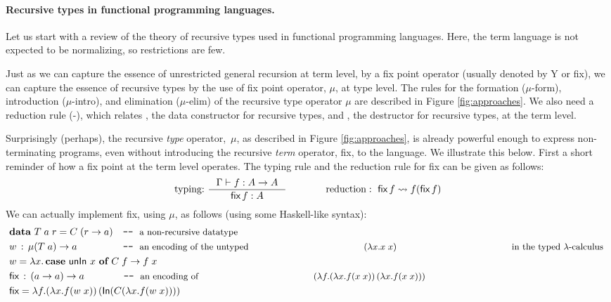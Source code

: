 \paragraph{Recursive types in functional programming languages.}
Let us start with a review of the theory of recursive types used
in functional programming languages. Here, the term
language is not expected to be normalizing, so restrictions are few.

Just as we can capture the essence of unrestricted general recursion at term
level, by a fix point operator (usually denoted by \textsf{Y} or \textsf{fix}),
we can capture the essence of recursive types by the
use of fix point operator, $\mu$, at type level. 
The rules for the formation {\small($\mu$-form)},
introduction {\small($\mu$-intro)}, and elimination {\small($\mu$-elim)} of
the recursive type operator $\mu$ are described in Figure \ref{fig:approaches}.
We also need a reduction rule {\small(\unIn-\In)}, which relates \In,
the data constructor for recursive types, and \unIn, the destructor for
recursive types, at the term level.

Surprisingly (perhaps), the recursive {\em type} operator,\ $\mu$, as described in
Figure \ref{fig:approaches}, is already powerful enough to express 
non-terminating programs, even without introducing the recursive {\em term}
operator, \textsf{fix}, to the language. We illustrate this below. First a 
short reminder of how a fix point at the term level operates. The typing rule
and the reduction rule for \textsf{fix} can be given as follows:
\[ \text{typing:}~ \inference{\Gamma |- f : A -> A}{\textsf{fix}\,f : A}
 \qquad\qquad
   \text{reduction}:~ \textsf{fix}\,f \rightsquigarrow f(\textsf{fix}\,f)
\]
We can actually implement \textsf{fix}, using $\mu$, as follows
(using some Haskell-like syntax):
\begin{align*}
& \textbf{data}~T\;a\;r = C\;(r -> a) \quad
          \texttt{-}\texttt{-}~\text{\small a non-recursive datatype} \\
& w \,:\, \mu(T\;a) -> a ~~ \qquad \qquad
          \texttt{-}\texttt{-}~\text{\small an encoding of the untyped
                                     $(\lambda x.x\;x)$
                                     in the typed $\lambda$-calculus}~ \\
& w = \lambda x . \,\textbf{case}~\textsf{unIn}~x~\textbf{of}~C\;f -> f\;x \\
& \textsf{fix} \,:\, (a -> a) -> a \qquad \qquad
          \texttt{-}\texttt{-}~\text{\small an encoding of 
                                     $(\lambda f.(\lambda x.f(x\;x))\,
                                                 (\lambda x.f(x\;x)))$} \\
& \textsf{fix} = \lambda f. (\lambda x. f (w\;x))\,(\textsf{In}(C(\lambda x. f (w\;x))))
\end{align*}

